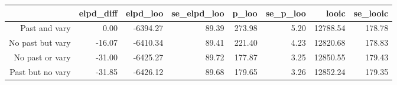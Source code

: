 \begin{table}[ht]
\centering
\begin{tabular}{rrrrrrrr}
  \hline
 & elpd\_diff & elpd\_loo & se\_elpd\_loo & p\_loo & se\_p\_loo & looic & se\_looic \\ 
  \hline
Past and vary & 0.00 & -6394.27 & 89.39 & 273.98 & 5.20 & 12788.54 & 178.78 \\ 
  No past but vary & -16.07 & -6410.34 & 89.41 & 221.40 & 4.23 & 12820.68 & 178.83 \\ 
  No past or vary & -31.00 & -6425.27 & 89.72 & 177.87 & 3.25 & 12850.55 & 179.43 \\ 
  Past but no vary & -31.85 & -6426.12 & 89.68 & 179.65 & 3.26 & 12852.24 & 179.35 \\ 
   \hline
\end{tabular}
\end{table}
